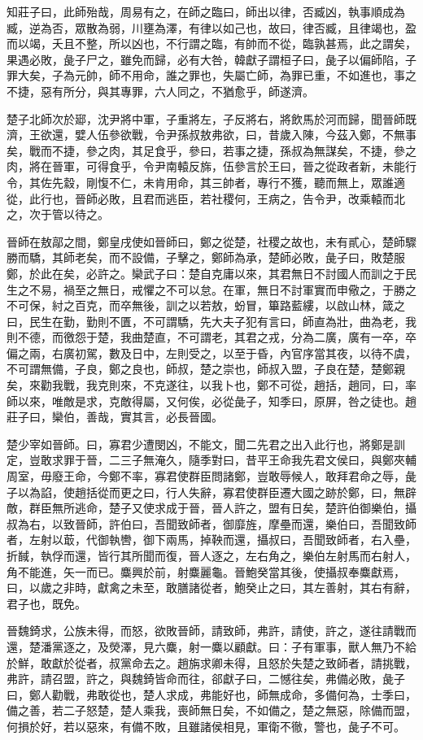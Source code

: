 \begin{pinyinscope}
知莊子曰，此師殆哉，周易有之，在師之臨曰，師出以律，否臧凶，執事順成為臧，逆為否，眾散為弱，川壅為澤，有律以如己也，故曰，律否臧，且律竭也，盈而以竭，夭且不整，所以凶也，不行謂之臨，有帥而不從，臨孰甚焉，此之謂矣，果遇必敗，彘子尸之，雖免而歸，必有大咎，韓獻子謂桓子曰，彘子以偏師陷，子罪大矣，子為元帥，師不用命，誰之罪也，失屬亡師，為罪已重，不如進也，事之不捷，惡有所分，與其專罪，六人同之，不猶愈乎，師遂濟。

楚子北師次於郔，沈尹將中軍，子重將左，子反將右，將飲馬於河而歸，聞晉師既濟，王欲還，嬖人伍參欲戰，令尹孫叔敖弗欲，曰，昔歲入陳，今茲入鄭，不無事矣，戰而不捷，參之肉，其足食乎，參曰，若事之捷，孫叔為無謀矣，不捷，參之肉，將在晉軍，可得食乎，令尹南轅反旆，伍參言於王曰，晉之從政者新，未能行令，其佐先縠，剛愎不仁，未肯用命，其三帥者，專行不獲，聽而無上，眾誰適從，此行也，晉師必敗，且君而逃臣，若社稷何，王病之，告令尹，改乘轅而北之，次于管以待之。

晉師在敖鄗之間，鄭皇戌使如晉師曰，鄭之從楚，社稷之故也，未有貳心，楚師驟勝而驕，其師老矣，而不設備，子擊之，鄭師為承，楚師必敗，彘子曰，敗楚服鄭，於此在矣，必許之。欒武子曰：楚自克庸以來，其君無日不討國人而訓之于民生之不易，禍至之無日，戒懼之不可以怠。在軍，無日不討軍實而申儆之，于勝之不可保，紂之百克，而卒無後，訓之以若敖，蚡冒，篳路藍縷，以啟山林，箴之曰，民生在勤，勤則不匱，不可謂驕，先大夫子犯有言曰，師直為壯，曲為老，我則不德，而徼怨于楚，我曲楚直，不可謂老，其君之戎，分為二廣，廣有一卒，卒偏之兩，右廣初駕，數及日中，左則受之，以至于昏，內官序當其夜，以待不虞，不可謂無備，子良，鄭之良也，師叔，楚之崇也，師叔入盟，子良在楚，楚鄭親矣，來勸我戰，我克則來，不克遂往，以我卜也，鄭不可從，趙括，趙同，曰，率師以來，唯敵是求，克敵得屬，又何俟，必從彘子，知季曰，原屏，咎之徒也。趙莊子曰，欒伯，善哉，實其言，必長晉國。

楚少宰如晉師。曰，寡君少遭閔凶，不能文，聞二先君之出入此行也，將鄭是訓定，豈敢求罪于晉，二三子無淹久，隨季對曰，昔平王命我先君文侯曰，與鄭夾輔周室，毋廢王命，今鄭不率，寡君使群臣問諸鄭，豈敢辱候人，敢拜君命之辱，彘子以為諂，使趙括從而更之曰，行人失辭，寡君使群臣遷大國之跡於鄭，曰，無辟敵，群臣無所逃命，楚子又使求成于晉，晉人許之，盟有日矣，楚許伯御樂伯，攝叔為右，以致晉師，許伯曰，吾聞致師者，御靡旌，摩壘而還，樂伯曰，吾聞致師者，左射以菆，代御執轡，御下兩馬，掉鞅而還，攝叔曰，吾聞致師者，右入壘，折馘，執俘而還，皆行其所聞而復，晉人逐之，左右角之，樂伯左射馬而右射人，角不能進，矢一而已。麋興於前，射麋麗龜。晉鮑癸當其後，使攝叔奉麋獻焉，曰，以歲之非時，獻禽之未至，敢膳諸從者，鮑癸止之曰，其左善射，其右有辭，君子也，既免。

晉魏錡求，公族未得，而怒，欲敗晉師，請致師，弗許，請使，許之，遂往請戰而還，楚潘黨逐之，及熒澤，見六麋，射一麋以顧獻。曰：子有軍事，獸人無乃不給於鮮，敢獻於從者，叔黨命去之。趙旃求卿未得，且怒於失楚之致師者，請挑戰，弗許，請召盟，許之，與魏錡皆命而往，郤獻子曰，二憾往矣，弗備必敗，彘子曰，鄭人勸戰，弗敢從也，楚人求成，弗能好也，師無成命，多備何為，士季曰，備之善，若二子怒楚，楚人乘我，喪師無日矣，不如備之，楚之無惡，除備而盟，何損於好，若以惡來，有備不敗，且雖諸侯相見，軍衛不徹，警也，彘子不可。


\end{pinyinscope}
